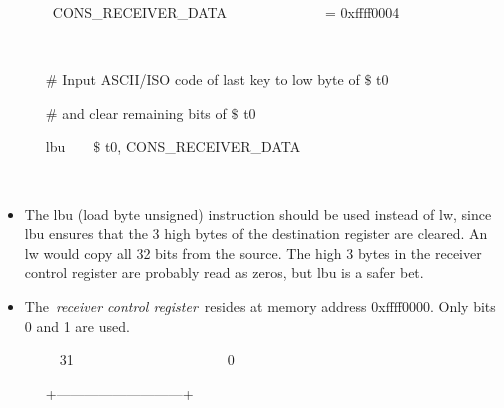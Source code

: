 \documentclass[12pt]{article}
\begin{document}
\begin{itemize}
\setlength{\parskip}{0.0pt}
{\fontsize{10pt}{12.0pt}\selectfont  \tabto{0.64in} \ \ \ \ CONS\_RECEIVER\_DATA\ \ \ \ \ \ \ \ \ \ \ \ \ \ =   0xffff0004\par}\par

{\fontsize{10pt}{12.0pt}\selectfont  \tabto{0.64in} \ \ \  \par}\par

{\fontsize{10pt}{12.0pt}\selectfont  \tabto{0.64in} \ \ \  $\#$  Input ASCII/ISO code of last key to low byte of $\$$ t0\par}\par

{\fontsize{10pt}{12.0pt}\selectfont  \tabto{0.64in} \ \ \  $\#$  and clear remaining bits of $\$$ t0\par}\par

{\fontsize{10pt}{12.0pt}\selectfont  \tabto{0.64in} \ \ \  lbu\ \ \ \  $\$$ t0, CONS\_RECEIVER\_DATA\par}\par

{\fontsize{10pt}{12.0pt}\selectfont  \tabto{0.64in} \ \ \  \par}\par

\setlength{\parskip}{5.04pt}
	\item {\fontsize{13pt}{15.6pt}\selectfont The lbu (load byte unsigned) instruction should be used instead of lw, since lbu ensures that the 3 high bytes of the destination register are cleared. An lw would copy all 32 bits from the source. The high 3 bytes in the receiver control register are probably read as zeros, but lbu is a safer bet.\par}\par

	\item {\fontsize{13pt}{15.6pt}\selectfont The \textit{receiver control register} resides at memory address 0xffff0000. Only bits 0 and 1 are used.\par}\par

\setlength{\parskip}{0.0pt}
{\fontsize{10pt}{12.0pt}\selectfont  \tabto{0.64in} \ \ \ \ \ 31\ \ \ \ \ \ \ \ \ \ \ \ \ \ \ \ \ \ \ \ \ \   0\par}\par

{\fontsize{10pt}{12.0pt}\selectfont  \tabto{0.64in} \ \ \  +---------------------------+\par}\par


\end{itemize}
\end{document}
